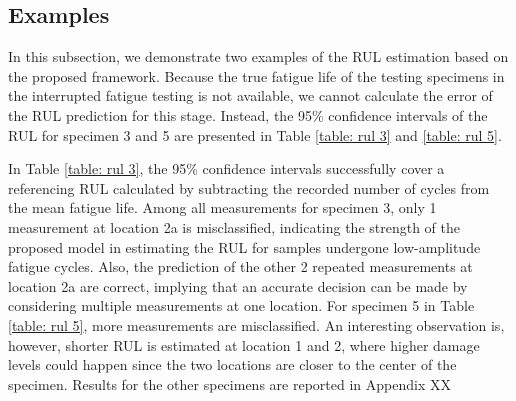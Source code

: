 \subsection{Examples}
In this subsection, we demonstrate two examples of the RUL estimation based on the proposed framework. Because the true fatigue life of the testing specimens in the interrupted fatigue testing is not available, we cannot calculate the error of the RUL prediction for this stage. Instead, the 95\% confidence intervals of the RUL for specimen 3 and 5 are presented in Table \ref{table: rul 3} and \ref{table: rul 5}. 

In Table \ref{table: rul 3}, the 95\% confidence intervals successfully cover a referencing RUL calculated by subtracting the recorded number of cycles from the mean fatigue life. Among all measurements for specimen 3, only 1 measurement at location 2a is misclassified, indicating the strength of the proposed model in estimating the RUL for samples undergone low-amplitude fatigue cycles. Also, the prediction of the other 2 repeated measurements at location 2a are correct, implying that an accurate decision can be made by considering multiple measurements at one location. For specimen 5 in Table \ref{table: rul 5}, more measurements are misclassified. An interesting observation is, however, shorter RUL is estimated at location 1 and 2, where higher damage levels could happen since the two locations are closer to the center of the specimen. Results for the other specimens are reported in Appendix XX

